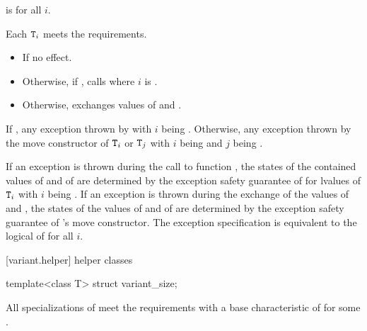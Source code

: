 \begin{itemdescr}
\pnum
\mandates
{} is  for all $i$.

\pnum
\expects
Each $\texttt{T}_i$ meets the  requirements.

\pnum
\effects
\begin{itemize}
\item
If  no effect.
\item
Otherwise, if , calls  where $i$ is .
\item
Otherwise, exchanges values of  and .
\end{itemize}

\pnum
\throws
If ,
any exception thrown by 
with $i$ being .
Otherwise, any exception thrown by the move constructor
of $\texttt{T}_i$ or $\texttt{T}_j$
with $i$ being  and $j$ being .

\pnum
\remarks
If an exception is thrown during the call to function ,
the states of the contained values of  and of  are
determined by the exception safety guarantee of  for lvalues of
$\texttt{T}_i$ with $i$ being .
If an exception is thrown during the exchange of the values of 
and , the states of the values of  and of 
are determined by the exception safety guarantee of 's move constructor.
The exception specification is equivalent to the logical  of
 for all $i$.
\end{itemdescr}

[variant.helper]{ helper classes}

%
\begin{itemdecl}
template<class T> struct variant_size;
\end{itemdecl}

\begin{itemdescr}
\pnum
All specializations of  meet the
 requirements
with a base characteristic of  for some .
\end{itemdescr}

